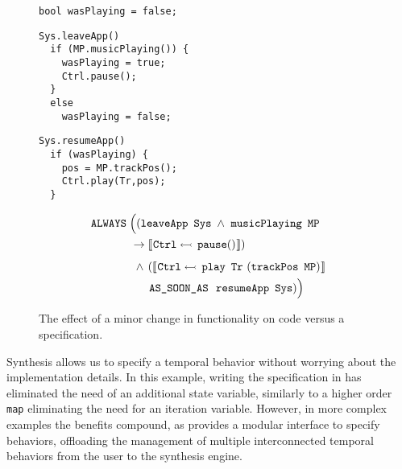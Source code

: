 \begin{figure}[t]
\begin{minipage}{.44\textwidth}
\vspace{-0.8em}
\begin{lstlisting}
bool wasPlaying = false;
\end{lstlisting}
\vspace{-0.5em}
\begin{lstlisting}
Sys.leaveApp()
  if (MP.musicPlaying()) {
    wasPlaying = true;
    Ctrl.pause();
  }
  else
    wasPlaying = false;
\end{lstlisting}
\vspace{-0.5em}
\begin{lstlisting}
Sys.resumeApp()
  if (wasPlaying) {
    pos = MP.trackPos();
    Ctrl.play(Tr,pos);
  }
\end{lstlisting}
\vspace{-0.8em}
\end{minipage}%
\vrule{}%
\begin{minipage}{.57\textwidth}
\begin{align*}
& \,\name{ALWAYS} \; \Big( (\name{leaveApp} \ \, \name{Sys} \; \wedge \ \name{musicPlaying} \ \, \name{MP} \\
& \,\quad \hspace{2.5em} \impl \upd{\name{Ctrl}}{\const{pause}} ) \\[0.5em]
& \,\quad \hspace{2.5em} \; \wedge \, (\upd{\name{Ctrl}}{\name{play} \ \, \name{Tr} \ (\name{trackPos} \ \, \name{MP})} \ \\
& \,\quad \hspace{2.5em} \phantom{\impl} \ \ \name{AS\_SOON\_AS} \ \ \name{resumeApp} \ \, \name{Sys} ) \Big)
\end{align*}
\end{minipage}
\vspace{-0.5em}
\caption{The effect of a minor change in functionality on code versus a specification.}
\label{fig:bigcode}
\end{figure}
%
Synthesis allows us to specify a temporal behavior without worrying about the implementation details.
In this example, writing the specification in \TSL has eliminated the need of an additional state variable, similarly to a higher order \texttt{map} eliminating the need for an iteration variable.
However, in more complex examples the benefits compound, as \TSL provides a modular interface to specify behaviors, offloading the management of multiple interconnected temporal behaviors from the user to the synthesis engine.
